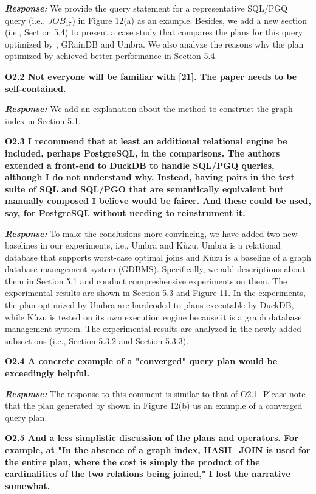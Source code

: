 \textbf{\textit{Response: }}
We provide the query statement for a representative SQL/PGQ query (i.e., $JOB_{17}$) in Figure 12(a) as an example.
Besides, we add a new section (i.e., Section 5.4) to present a case study that compares the plans for this query optimized by \name, GRainDB and Umbra.
We also analyze the reasons why the plan optimized by \name achieved better performance in Section 5.4.


\textbf{
O2.2 Not everyone will be familiar with [21]. The paper needs to be self-contained. }

\textbf{\textit{Response: }}
We add an explanation about the method to construct the graph index in Section 5.1.

\textbf{ 
O2.3 I recommend that at least an additional relational engine be included, perhaps PostgreSQL, in the comparisons. The authors extended a front-end to DuckDB to handle SQL/PGQ queries, although I do not understand why. Instead, having pairs in the test suite of SQL and SQL/PGO that are semantically equivalent but manually composed I believe would be fairer. And these could be used, say, for PostgreSQL without needing to reinstrument it.}

\textbf{\textit{Response: }}
To make the conclusions more convincing, we have added two new baselines in our experiments, i.e., Umbra and K\`uzu.
Umbra is a relational database that supports worst-case optimal joins and K\`uzu is a baseline of a graph database management system (GDBMS).
Specifically, we add descriptions about them in Section 5.1 and conduct compreshensive experiments on them.
The experimental results are shown in Section 5.3 and Figure 11.
In the experiments, the plan optimized by Umbra are hardcoded to plans executable by DuckDB, while K\`uzu is tested on its own execution engine because it is a graph database management system.
The experimental results are analyzed in the newly added subsections (i.e., Section 5.3.2 and Section 5.3.3).


\textbf{
O2.4 A concrete example of a "converged" query plan would be exceedingly helpful.} 

\textbf{\textit{Response: }} 
The response to this comment is similar to that of O2.1.
Please note that the plan generated by \name shown in Figure 12(b) us an example of a converged query plan.

\textbf{
O2.5 And a less simplistic discussion of the plans and operators. For example, at "In the absence of a graph index, HASH\_JOIN is used for the entire plan, where the cost is simply the product of the cardinalities of the two relations being joined," I lost the narrative somewhat. }

